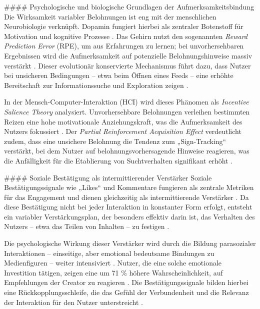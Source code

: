 \documentclass[11pt,a4paper]{article}
\begin{document}
\#\#\#\# Psychologische und biologische Grundlagen der Aufmerksamkeitsbindung Die Wirksamkeit variabler Belohnungen ist eng mit der menschlichen Neurobiologie verknüpft. Dopamin fungiert hierbei als zentraler Botenstoff für Motivation und kognitive Prozesse \autocite{grey_grey_0f12df7af18a47b8b7a378bd2f9ca935}. Das Gehirn nutzt den sogenannten \textit{Reward Prediction Error} (RPE), um aus Erfahrungen zu lernen; bei unvorhersehbaren Ergebnissen wird die Aufmerksamkeit auf potenzielle Belohnungshinweise massiv verstärkt \autocite{europepmc_42137086}. Dieser evolutionär konservierte Mechanismus führt dazu, dass Nutzer bei unsicheren Bedingungen – etwa beim Öffnen eines Feeds – eine erhöhte Bereitschaft zur Informationssuche und Exploration zeigen \autocite{europepmc_42137086}.

In der Mensch-Computer-Interaktion (HCI) wird dieses Phänomen als \textit{Incentive Salience Theory} analysiert. Unvorhersehbare Belohnungen verleihen bestimmten Reizen eine hohe motivationale Anziehungskraft, was die Aufmerksamkeit des Nutzers fokussiert \autocite{europepmc_42137086}. Der \textit{Partial Reinforcement Acquisition Effect} verdeutlicht zudem, dass eine unsichere Belohnung die Tendenz zum „Sign-Tracking“ verstärkt, bei dem Nutzer auf belohnungsvorhersagende Hinweise reagieren, was die Anfälligkeit für die Etablierung von Suchtverhalten signifikant erhöht \autocite{europepmc_42137086}.

\#\#\#\# Soziale Bestätigung als intermittierender Verstärker Soziale Bestätigungssignale wie „Likes“ und Kommentare fungieren als zentrale Metriken für das Engagement und dienen gleichzeitig als intermittierende Verstärker \autocite{openalex_W2946816985}. Da diese Bestätigung nicht bei jeder Interaktion in konstanter Form erfolgt, entsteht ein variabler Verstärkungsplan, der besonders effektiv darin ist, das Verhalten des Nutzers – etwa das Teilen von Inhalten – zu festigen \autocite{doaj_10febcbb5e60420699a1d4570a075832,crossref_10_55032_atskj_psychol_2020_1103}.

Die psychologische Wirkung dieser Verstärker wird durch die Bildung parasozialer Interaktionen – einseitige, aber emotional bedeutsame Bindungen zu Medienfiguren – weiter intensiviert \autocite{europepmc_42073973,grey_grey_5d5c282590c448fc8776b04f78a08de5}. Nutzer, die eine solche emotionale Investition tätigen, zeigen eine um 71 \% höhere Wahrscheinlichkeit, auf Empfehlungen der Creator zu reagieren \autocite{grey_grey_5d5c282590c448fc8776b04f78a08de5}. Die Bestätigungssignale bilden hierbei eine Rückkopplungsschleife, die das Gefühl der Verbundenheit und die Relevanz der Interaktion für den Nutzer unterstreicht \autocite{openalex_W2946816985,europepmc_42073973}.
\end{document}
